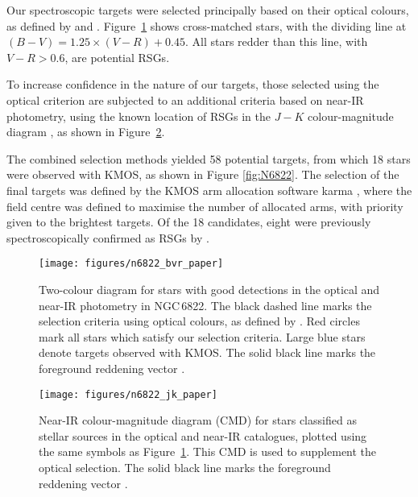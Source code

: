 \documentclass[iop]{emulateapj}
\begin{document}
Our spectroscopic targets were selected principally based on their optical colours, as defined by
\cite{1998ApJ...501..153M} and
\cite{2012AJ....144....2L}.
Figure~\ref{fig:BVR} shows cross-matched stars, with the dividing line at $(B - V) = 1.25 \times (V - R)+0.45$.
All stars redder than this line, with $V - R > 0.6$, are potential RSGs.

To increase confidence in the nature of our targets, those selected using the optical criterion are subjected to an additional criteria based on near-IR photometry,
using the known location of RSGs in the $J-K$ colour-magnitude diagram
\citep{2000ApJ...542..804N}, as shown in Figure~\ref{fig:JK}.

The combined selection methods yielded 58 potential targets, from which 18 stars were observed with KMOS, as shown in Figure
\ref{fig:N6822}.
The selection of the final targets was defined by the KMOS arm allocation software {\sc karma}
\citep{2008SPIE.7019E..0TW},
where the field centre was defined to maximise the number of allocated arms,
with priority given to the brightest targets.
Of the 18 candidates, eight were previously spectroscopically confirmed as RSGs by
\cite{2012AJ....144....2L}.


\begin{figure}
 \texttt{[image: figures/n6822\_bvr\_paper]}
 \caption{
          Two-colour diagram for stars with good detections in the optical and near-IR photometry in NGC\,6822.
          The black dashed line marks the selection criteria using optical colours, as defined by
          \protect\cite{2012AJ....144....2L}.
          Red circles mark all stars which satisfy our selection criteria.
          Large blue stars denote targets observed with KMOS.
          The solid black line marks the foreground reddening vector
          \protect\citep{1998ApJ...500..525S}.
         }
 \label{fig:BVR}
\end{figure}

\begin{figure}
 \texttt{[image: figures/n6822\_jk\_paper]}
 \caption{
          Near-IR colour-magnitude diagram (CMD) for stars classified as stellar sources in the optical and near-IR catalogues, plotted using the same symbols as Figure~\ref{fig:BVR}.
          This CMD is used to supplement the optical selection.
          The solid black line marks the foreground reddening vector
          \protect\citep{1998ApJ...500..525S}.
         }
 \label{fig:JK}
\end{figure}
\end{document}
